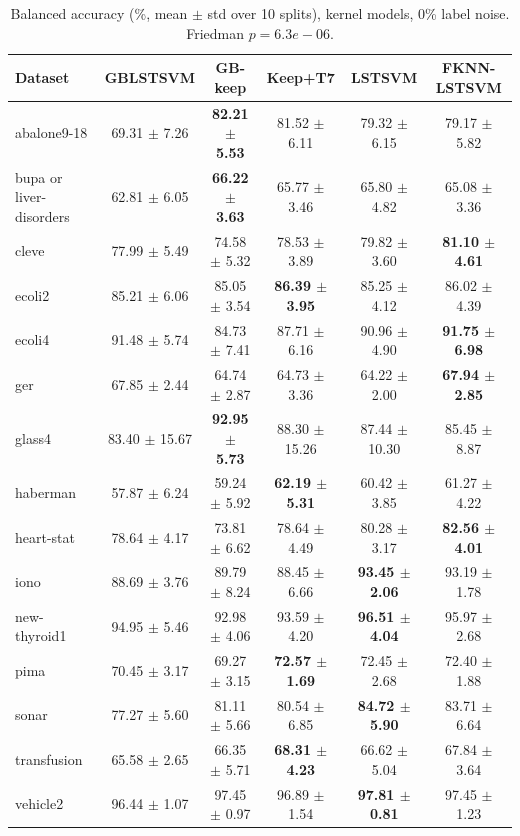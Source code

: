 \begin{table}[t]
\centering\small
\caption{Balanced accuracy (\%, mean $\pm$ std over 10 splits), kernel models, 0\% label noise. Friedman $p = 6.3e-06$.}
\begin{tabular}{lccccc}
\toprule
Dataset & GBLSTSVM & GB-keep & Keep+T7 & LSTSVM & FKNN-LSTSVM \\
\midrule
abalone9-18 & 69.31 $\pm$ 7.26 & \textbf{82.21 $\pm$ 5.53} & 81.52 $\pm$ 6.11 & 79.32 $\pm$ 6.15 & 79.17 $\pm$ 5.82 \\
bupa or liver-disorders & 62.81 $\pm$ 6.05 & \textbf{66.22 $\pm$ 3.63} & 65.77 $\pm$ 3.46 & 65.80 $\pm$ 4.82 & 65.08 $\pm$ 3.36 \\
cleve & 77.99 $\pm$ 5.49 & 74.58 $\pm$ 5.32 & 78.53 $\pm$ 3.89 & 79.82 $\pm$ 3.60 & \textbf{81.10 $\pm$ 4.61} \\
ecoli2 & 85.21 $\pm$ 6.06 & 85.05 $\pm$ 3.54 & \textbf{86.39 $\pm$ 3.95} & 85.25 $\pm$ 4.12 & 86.02 $\pm$ 4.39 \\
ecoli4 & 91.48 $\pm$ 5.74 & 84.73 $\pm$ 7.41 & 87.71 $\pm$ 6.16 & 90.96 $\pm$ 4.90 & \textbf{91.75 $\pm$ 6.98} \\
ger & 67.85 $\pm$ 2.44 & 64.74 $\pm$ 2.87 & 64.73 $\pm$ 3.36 & 64.22 $\pm$ 2.00 & \textbf{67.94 $\pm$ 2.85} \\
glass4 & 83.40 $\pm$ 15.67 & \textbf{92.95 $\pm$ 5.73} & 88.30 $\pm$ 15.26 & 87.44 $\pm$ 10.30 & 85.45 $\pm$ 8.87 \\
haberman & 57.87 $\pm$ 6.24 & 59.24 $\pm$ 5.92 & \textbf{62.19 $\pm$ 5.31} & 60.42 $\pm$ 3.85 & 61.27 $\pm$ 4.22 \\
heart-stat & 78.64 $\pm$ 4.17 & 73.81 $\pm$ 6.62 & 78.64 $\pm$ 4.49 & 80.28 $\pm$ 3.17 & \textbf{82.56 $\pm$ 4.01} \\
iono & 88.69 $\pm$ 3.76 & 89.79 $\pm$ 8.24 & 88.45 $\pm$ 6.66 & \textbf{93.45 $\pm$ 2.06} & 93.19 $\pm$ 1.78 \\
new-thyroid1 & 94.95 $\pm$ 5.46 & 92.98 $\pm$ 4.06 & 93.59 $\pm$ 4.20 & \textbf{96.51 $\pm$ 4.04} & 95.97 $\pm$ 2.68 \\
pima & 70.45 $\pm$ 3.17 & 69.27 $\pm$ 3.15 & \textbf{72.57 $\pm$ 1.69} & 72.45 $\pm$ 2.68 & 72.40 $\pm$ 1.88 \\
sonar & 77.27 $\pm$ 5.60 & 81.11 $\pm$ 5.66 & 80.54 $\pm$ 6.85 & \textbf{84.72 $\pm$ 5.90} & 83.71 $\pm$ 6.64 \\
transfusion & 65.58 $\pm$ 2.65 & 66.35 $\pm$ 5.71 & \textbf{68.31 $\pm$ 4.23} & 66.62 $\pm$ 5.04 & 67.84 $\pm$ 3.64 \\
vehicle2 & 96.44 $\pm$ 1.07 & 97.45 $\pm$ 0.97 & 96.89 $\pm$ 1.54 & \textbf{97.81 $\pm$ 0.81} & 97.45 $\pm$ 1.23 \\

\end{tabular}
\end{table}
